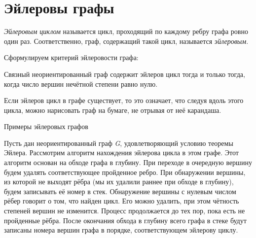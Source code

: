 \section{Эйлеровы графы}

\emph{Эйлеровым циклом} называется цикл, проходящий по каждому ребру графа 
ровно один раз. Соответственно, граф, содержащий такой цикл, называется 
\emph{эйлеровым}.

Сформулируем критерий эйлеровости графа:

\begin{theorem}[Эйлер, 1736г.]
Связный неориентированный граф содержит эйлеров цикл тогда и только тогда, 	
когда число вершин нечётной степени равно нулю.
\end{theorem}

Если эйлеров цикл в графе существует, то это означает, что следуя вдоль этого 
цикла, можно нарисовать граф на бумаге, не отрывая от неё карандаша.

\begin{floatingfigure}{10cm}
	\center
	\caption{Примеры эйлеровых графов}
	\label{Examples of Eulerian graphs}
\end{floatingfigure}

Пусть дан неориентированный граф \emph{G}, удовлетворяющий условию теоремы 
Эйлера. Рассмотрим алгоритм нахождения эйлерова цикла в этом графе. Этот 
алгоритм основан на обходе графа в глубину. При переходе в очередную вершину 
будем удалять соответствующее пройденное ребро. При обнаружении вершины, из 
которой не выходят рёбра (мы их удалили раннее при обходе в глубину), будем 
записывать её номер в стек. Обнаружение вершины с нулевым числом рёбер говорит 
о том, что найден цикл. Его можно удалить, при этом чётность степеней вершин не 
изменится. Процесс продолжается до тех пор, пока есть не пройденные рёбра. 
После окончания обхода в глубину всего графа в стеке будут записаны номера 
вершин графа в порядке, соответствующем эйлерову циклу.

